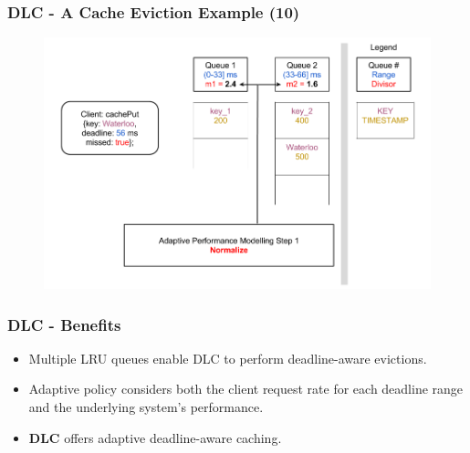\documentclass{beamer}
\newcommand{\myv}{\vspace{3 mm}}
\begin{document}
\begin{frame}
  \frametitle{DLC - A Cache Eviction Example (10)}
  \begin{figure}
    \begin{center}
      \centerline{\includegraphics[scale=0.37]{img/DLC_V8_10.png}}
    \end{center}
  \end{figure}
\end{frame}

\begin{frame}
  \frametitle{DLC - Benefits}
  \vspace{-15 mm}
  \begin{itemize}
  \item Multiple LRU queues enable DLC to perform deadline-aware evictions.
    \myv
  \item Adaptive policy considers both the client request rate for each
    deadline range and the underlying system's performance.  \myv

  \item \textbf{DLC} offers adaptive deadline-aware caching.
  \end{itemize}
\end{frame}
\end{document}
